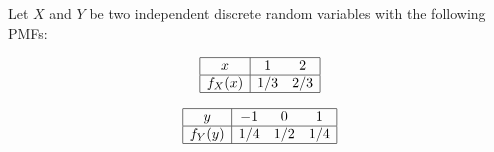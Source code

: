 \begin{exercise}
\begin{questions}
\question
Let $X$ and $Y$ be two independent discrete random variables with the following PMFs:
\begin{center}
\begin{minipage}{\linewidth}
\begin{minipage}{0.4\linewidth}
\[
\begin{array}{|c|cc|} \hline
x     & 1     & 2   \\ \hline
f_X(x)  & 1/3   & 2/3 \\ \hline
\end{array}
\]
\end{minipage}
\begin{minipage}{0.4\linewidth}
\[
\begin{array}{|c|ccc|} \hline
y     & -1    & 0     & 1     \\ \hline
f_Y(y)  & 1/4   & 1/2   & 1/4   \\ \hline
\end{array}
\]
\end{minipage}
\end{minipage}
\end{center}

\end{questions}
\end{exercise}
